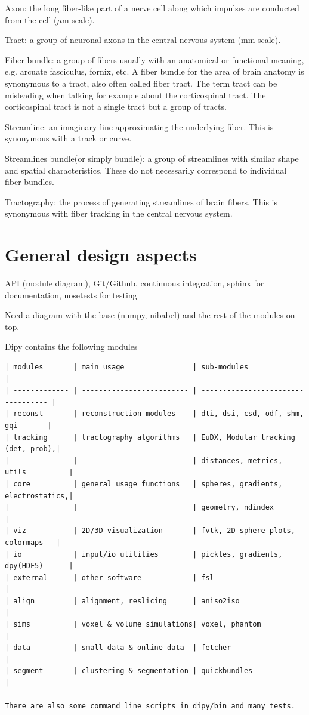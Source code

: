 \documentclass{bioinfo}
\begin{document}
Axon: the long fiber-like part of a nerve cell along which impulses are conducted from the cell ($\mu$m scale). 

Tract: a group of neuronal axons in the central nervous system (mm scale).

Fiber bundle: a group of fibers usually with an anatomical or functional meaning, e.g.
arcuate fasciculus, fornix, etc. A fiber bundle for the area of brain anatomy is synonymous to a
tract, also often called fiber tract. The term tract can be misleading when talking for example about
the corticospinal tract. The corticospinal tract is not a single tract but a group of tracts.

Streamline: an imaginary line approximating the underlying fiber. This is synonymous with a track or curve. 

Streamlines bundle(or simply bundle): a group of streamlines with similar shape and spatial characteristics. These do not necessarily correspond to individual fiber bundles. 

Tractography: the process of generating streamlines of brain fibers. This is synonymous with fiber tracking in the central nervous system.

\section{General design aspects}

API (module diagram), Git/Github, continuous integration, sphinx for documentation, nosetests for testing

Need a diagram with the base (numpy, nibabel) and the rest of the modules on top.

Dipy contains the following modules

\tiny
\begin{verbatim}
| modules       | main usage                | sub-modules                        |
| ------------- | ------------------------- | ---------------------------------- |
| reconst       | reconstruction modules    | dti, dsi, csd, odf, shm, gqi       |
| tracking      | tractography algorithms   | EuDX, Modular tracking (det, prob),|
|               |                           | distances, metrics, utils          |
| core          | general usage functions   | spheres, gradients, electrostatics,|
|               |                           | geometry, ndindex                  |       
| viz           | 2D/3D visualization       | fvtk, 2D sphere plots, colormaps   |
| io            | input/io utilities        | pickles, gradients, dpy(HDF5)      |
| external      | other software            | fsl                                |
| align         | alignment, reslicing      | aniso2iso                          |
| sims          | voxel & volume simulations| voxel, phantom                     |
| data          | small data & online data  | fetcher                            |
| segment       | clustering & segmentation | quickbundles                       |

There are also some command line scripts in dipy/bin and many tests.
\end{verbatim}
\normalsize
\end{document}

